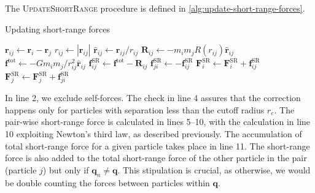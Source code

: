 The \textsc{UpdateShortRange} procedure is defined in \autoref{alg:update-short-range-forces}.
\begin{algorithm}
    \caption{Updating short-range forces}\label{alg:update-short-range-forces}
    \begin{algorithmic}[1]
        \Return
        \EndIf
        \State $\mathbf{r}_{ij} \gets \mathbf{r}_i - \mathbf{r}_j$
        \Return
        \EndIf
        \State $r_{ij} \gets |\mathbf{r}_{ij}|$
        \State $\mathbf{\hat{r}}_{ij} \gets \mathbf{r}_{ij} / r_{ij}$
        \State $\mathbf{R}_{ij} \gets -m_i m_j R(r_{ij}) \mathbf{\hat{r}}_{ij}$
        \State $\mathbf{f}^\text{tot} \gets -G m_i m_j / r_{ij}^2 \mathbf{\hat{r}}_{ij}$
        \State $\mathbf{f}^\text{SR}_{ij} \gets \mathbf{f}^\text{tot} - \mathbf{R}_{ij}$
        \State $\mathbf{f}^\text{SR}_{ji} \gets -\mathbf{f}^\text{SR}_{ij}$
        \State $\mathbf{F}^\text{SR}_i \gets \mathbf{F}^\text{SR}_i + \mathbf{f}^\text{SR}_{ij}$
         
        \State $\mathbf{F}^\text{SR}_j \gets \mathbf{F}^\text{SR}_j + \mathbf{f}^\text{SR}_{ji}$
        \EndIf
        \EndProcedure
    \end{algorithmic}
\end{algorithm}
In line 2, we exclude self-forces.
The check in line 4 assures that the correction happens only for particles with separation less than the cutoff radius $r_e$.
The pair-wise short-range force is calculated in lines 5--10, with the calculation in line 10 exploiting Newton's third law, as described previously.
The accumulation of total short-range force for a given particle takes place in line 11.
The short-range force is also added to the total short-range force of the other particle in the pair (particle $j$) but only if $\mathbf{q}_n \neq \mathbf{q}$.
This stipulation is crucial, as otherwise, we would be double counting the forces between particles within $\mathbf{q}$.

